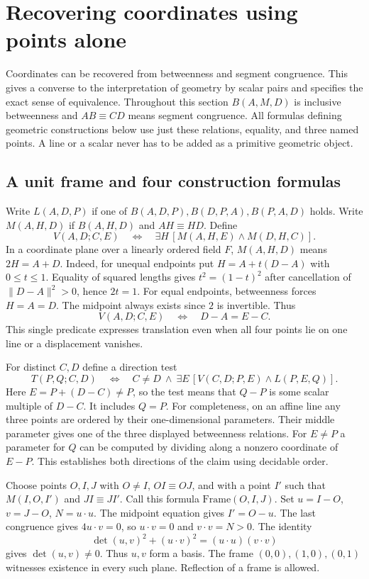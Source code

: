 \section{Recovering coordinates using points alone}
\label{sec:frame-inverse}

Coordinates can be recovered from betweenness and segment congruence. This
gives a converse to the interpretation of geometry by scalar pairs and
specifies the exact sense of equivalence. Throughout this section
$B(A,M,D)$ is inclusive betweenness and $AB\equiv CD$ means segment
congruence. All formulas defining geometric constructions below use just
these relations, equality, and three named points. A line or a scalar
never has to be added as a primitive geometric object.

\subsection{A unit frame and four construction formulas}

Write $L(A,D,P)$ if one of $B(A,D,P),B(D,P,A),B(P,A,D)$ holds. Write
$M(A,H,D)$ if $B(A,H,D)$ and $AH\equiv HD$. Define
\[
 V(A,D;C,E)\quad\Longleftrightarrow\quad
 \exists H\,[M(A,H,E)\land M(D,H,C)].
\]
In a coordinate plane over a linearly ordered field $F$, $M(A,H,D)$
means $2H=A+D$. Indeed, for unequal endpoints put
$H=A+t(D-A)$ with $0\leq t\leq1$. Equality of squared lengths gives
$t^2=(1-t)^2$ after cancellation of $\|D-A\|^2>0$, hence $2t=1$.
For equal endpoints, betweenness forces $H=A=D$. The midpoint always
exists since $2$ is invertible. Thus
\[
 V(A,D;C,E)\quad\Longleftrightarrow\quad D-A=E-C.
\]
This single predicate expresses translation even when all four points
lie on one line or a displacement vanishes.

For distinct $C,D$ define a direction test
\[
 T(P,Q;C,D)\quad\Longleftrightarrow\quad
 C\ne D\ \land\ \exists E\,[V(C,D;P,E)\land L(P,E,Q)] .
\]
Here $E=P+(D-C)\ne P$, so the test means that $Q-P$ is some scalar
multiple of $D-C$. It includes $Q=P$. For completeness, on an affine
line any three points are ordered by their one-dimensional parameters.
Their middle parameter gives one of the three displayed betweenness
relations. For $E\ne P$ a parameter for $Q$ can be computed by dividing
along a nonzero coordinate of $E-P$. This establishes both directions
of the claim using decidable order.

Choose points $O,I,J$ with $O\ne I$, $OI\equiv OJ$, and with a point
$I'$ such that $M(I,O,I')$ and $JI\equiv JI'$. Call this formula
$\mathrm{Frame}(O,I,J)$. Set $u=I-O$, $v=J-O$, $N=u\cdot u$.
The midpoint equation gives $I'=O-u$. The last congruence gives
$4u\cdot v=0$, so $u\cdot v=0$ and $v\cdot v=N>0$. The identity
\[
 \det(u,v)^2+(u\cdot v)^2=(u\cdot u)(v\cdot v)
\]
gives $\det(u,v)\ne0$. Thus $u,v$ form a basis. The frame
$(0,0),(1,0),(0,1)$ witnesses existence in every such plane.
Reflection of a frame is allowed.

